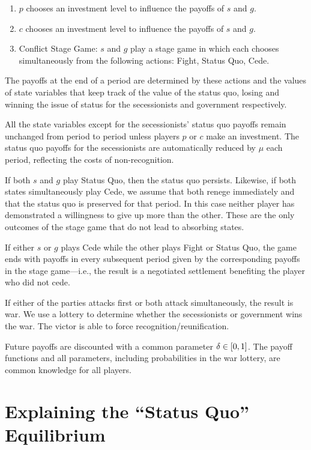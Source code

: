 \begin{enumerate} 
\item $p$ chooses an investment level to influence the payoffs of $s$ and $g$. 
 
\item $c$ chooses an investment level to influence the payoffs of $s$ and $g$.
 
\item Conflict Stage Game: $s$ and $g$ play a stage game in which each chooses simultaneously from the following actions: Fight, Status Quo, Cede. 
\end{enumerate}

The payoffs at the end of a period are determined by these actions and the values of state variables that keep track of the value of the status quo, losing and winning the issue of status for the secessionists and government respectively. 

All the state variables except for the secessionists' status quo payoffs remain unchanged from period to period unless players $p$ or $c$ make an investment. The status quo payoffs for the secessionists are automatically reduced by $\mu$ each period, reflecting the costs of non-recognition.

If both $s$ and $g$ play Status Quo, then the status quo persists. Likewise, if both states simultaneously play Cede, we assume that both renege immediately and that the status quo is preserved for that period. In this case neither player has demonstrated a willingness to give up more than the other. These are the only outcomes of the stage game that do not lead to absorbing states. 

If either $s$ or $g$ plays Cede while the other plays Fight or Status Quo, the game ends with payoffs in every subsequent period given by the corresponding payoffs in the stage game---i.e., the result is a negotiated settlement benefiting the player who did not cede. 

If either of the parties attacks first or both attack simultaneously, the result is war. We use a lottery to determine whether the secessionists or government wins the war. The victor is able to force recognition/reunification.

Future payoffs are discounted with a common parameter $\delta \in [0,1]$. The payoff functions and all parameters, including probabilities in the war lottery, are common knowledge for all players.


\section{Explaining the ``Status Quo'' Equilibrium} 
\label{sec:main}


